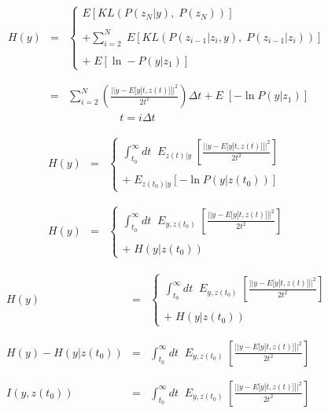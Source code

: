 {
\begin{eqnarray*}
  H(y) & = & \left\{\begin{array}{l} E[KL(P(z_N|y),\;P(z_N))] \\ \\ + \sum_{i=2}^N  \; E[KL(P(z_{i-1}|z_i,y),\;P(z_{i-1}|z_i))] \\ \\ +\;E[\ln -P(y|z_1)] \end{array}\right.
  \\
  \\
  \\
  & = & \sum_{i = 2}^N  \left(\frac{||y-E[y|t,z(t)]||^2}{2t^2}\right) \Delta t + E\;[- \ln P(y|z_1)] \\
  & & \;\;\;\;\;\;\;\;\;\;\;\;\;\;\;\;\;t = i\Delta t
\end{eqnarray*}


\begin{eqnarray*}
H(y) & = & \left\{\begin{array}{l}\int_{t_0}^\infty dt \;\; E_{z(t)|y}\;\left[\frac{||y - E[y|t,z(t)]||^2}{2t^2}\right] \\ \\ + \;E_{z(t_0)|y}[-\ln P(y|z(t_0))]\end{array}\right. \\
\\
\\
  H(y) & = & \left\{\begin{array}{l}\int_{t_0}^\infty dt \;\; E_{y,z(t_0)}\;\left[\frac{||y - E[y|t,z(t)]||^2}{2t^2}\right] \\ \\ +\;H(y|z(t_0))\end{array}\right.
\end{eqnarray*}


{\huge
\begin{eqnarray*}
  H(y) & = & \left\{\begin{array}{l}\int_{t_0}^\infty dt \;\; E_{y,z(t_0)}\;\left[\frac{||y - E[y|t,z(t)]||^2}{2t^2}\right] \\ \\ +\;H(y|z(t_0))\end{array}\right. \\
  \\
  \\
  H(y) - H(y|z(t_0)) & = & \int_{t_0}^\infty dt \;\; E_{y,z(t_0)}\;\left[\frac{||y - E[y|t,z(t)]||^2}{2t^2}\right] \\
  \\
  \\
  I(y,z(t_0)) & = & \int_{t_0}^\infty dt \;\; E_{y,z(t_0)}\;\left[\frac{||y - E[y|t,z(t)]||^2}{2t^2}\right] 
\end{eqnarray*}

}}
